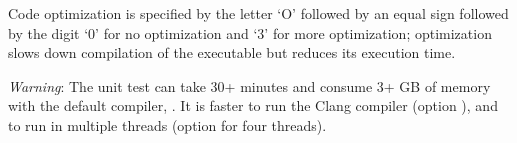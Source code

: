 Code optimization is specified by the letter `O' followed by an equal
sign followed by the digit `0' for no optimization and `3' for more
optimization; optimization slows down compilation of the executable
but reduces its execution time.

\emph{Warning}: The unit test can take 30+ minutes and consume 3+ GB
of memory with the default compiler, .  It is faster
to run the Clang compiler (option ), and to run in
multiple threads (option  for four threads).





